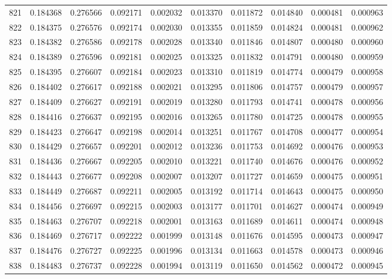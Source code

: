 \begin{tabular}{lrrrrrrrrr}
821 & 0.184368 & 0.276566 & 0.092171 & 0.002032 & 0.013370 & 0.011872 & 0.014840 & 0.000481 & 0.000963 \\
822 & 0.184375 & 0.276576 & 0.092174 & 0.002030 & 0.013355 & 0.011859 & 0.014824 & 0.000481 & 0.000962 \\
823 & 0.184382 & 0.276586 & 0.092178 & 0.002028 & 0.013340 & 0.011846 & 0.014807 & 0.000480 & 0.000960 \\
824 & 0.184389 & 0.276596 & 0.092181 & 0.002025 & 0.013325 & 0.011832 & 0.014791 & 0.000480 & 0.000959 \\
825 & 0.184395 & 0.276607 & 0.092184 & 0.002023 & 0.013310 & 0.011819 & 0.014774 & 0.000479 & 0.000958 \\
826 & 0.184402 & 0.276617 & 0.092188 & 0.002021 & 0.013295 & 0.011806 & 0.014757 & 0.000479 & 0.000957 \\
827 & 0.184409 & 0.276627 & 0.092191 & 0.002019 & 0.013280 & 0.011793 & 0.014741 & 0.000478 & 0.000956 \\
828 & 0.184416 & 0.276637 & 0.092195 & 0.002016 & 0.013265 & 0.011780 & 0.014725 & 0.000478 & 0.000955 \\
829 & 0.184423 & 0.276647 & 0.092198 & 0.002014 & 0.013251 & 0.011767 & 0.014708 & 0.000477 & 0.000954 \\
830 & 0.184429 & 0.276657 & 0.092201 & 0.002012 & 0.013236 & 0.011753 & 0.014692 & 0.000476 & 0.000953 \\
831 & 0.184436 & 0.276667 & 0.092205 & 0.002010 & 0.013221 & 0.011740 & 0.014676 & 0.000476 & 0.000952 \\
832 & 0.184443 & 0.276677 & 0.092208 & 0.002007 & 0.013207 & 0.011727 & 0.014659 & 0.000475 & 0.000951 \\
833 & 0.184449 & 0.276687 & 0.092211 & 0.002005 & 0.013192 & 0.011714 & 0.014643 & 0.000475 & 0.000950 \\
834 & 0.184456 & 0.276697 & 0.092215 & 0.002003 & 0.013177 & 0.011701 & 0.014627 & 0.000474 & 0.000949 \\
835 & 0.184463 & 0.276707 & 0.092218 & 0.002001 & 0.013163 & 0.011689 & 0.014611 & 0.000474 & 0.000948 \\
836 & 0.184469 & 0.276717 & 0.092222 & 0.001999 & 0.013148 & 0.011676 & 0.014595 & 0.000473 & 0.000947 \\
837 & 0.184476 & 0.276727 & 0.092225 & 0.001996 & 0.013134 & 0.011663 & 0.014578 & 0.000473 & 0.000946 \\
838 & 0.184483 & 0.276737 & 0.092228 & 0.001994 & 0.013119 & 0.011650 & 0.014562 & 0.000472 & 0.000945 \\

\end{tabular}

